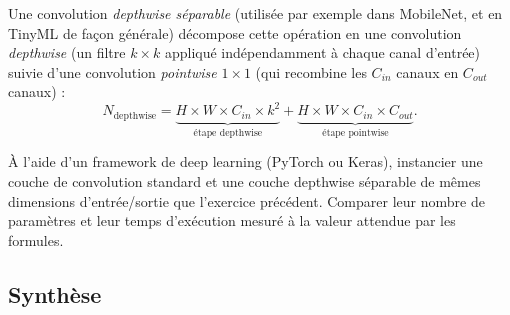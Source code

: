 Une convolution \emph{depthwise séparable} (utilisée par exemple dans MobileNet, et en TinyML de façon générale) décompose cette opération en une convolution \emph{depthwise} (un filtre $k\times k$ appliqué indépendamment à chaque canal d'entrée) suivie d'une convolution \emph{pointwise} $1\times1$ (qui recombine les $C_{in}$ canaux en $C_{out}$ canaux) :
\[
N_{\text{depthwise}}=
\underbrace{H\times W\times C_{in}\times k^2}_{\text{étape depthwise}}
+
\underbrace{H\times W\times C_{in}\times C_{out}}_{\text{étape pointwise}}.
\]


\begin{shortcut}

À l'aide d'un framework de deep learning (PyTorch ou Keras), instancier une couche de convolution standard et une couche depthwise séparable de mêmes dimensions d'entrée/sortie que l'exercice précédent. Comparer leur nombre de paramètres et leur temps d'exécution mesuré à la valeur attendue par les formules.

% 
\end{shortcut}

\subsection{Synthèse}

